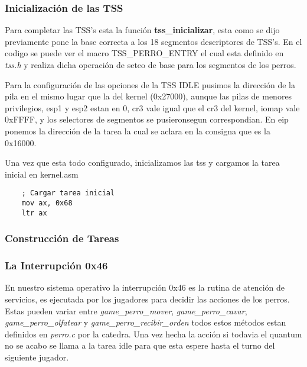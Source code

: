 \subsubsection{Inicialización de las TSS}
Para completar las TSS's esta la función \textbf{tss\_inicializar}, esta como se dijo previamente pone la base correcta a los 18 segmentos descriptores de TSS's. En el codigo se puede ver el macro TSS\_PERRO\_ENTRY el cual esta definido en \textit{tss.h} y realiza dicha operación de seteo de base para los segmentos de los perros.

Para la configuración de las opciones de la TSS IDLE pusimos la dirección de la pila en el mismo lugar que la del kernel (0x27000), aunque las pilas de menores privilegios, esp1 y esp2 estan en 0, cr3 vale igual que el cr3 del kernel, iomap vale 0xFFFF, y los selectores de segmentos se pusieronsegun correspondian. En eip ponemos la dirección de la tarea la cual se aclara en la consigna que es la 0x16000.

Una vez que esta todo configurado, inicializamos las tss y cargamos la tarea inicial en kernel.asm

\begin{lstlisting}
	; Cargar tarea inicial
	mov ax, 0x68
	ltr ax
\end{lstlisting}

\subsubsection{Construcción de Tareas}


\subsubsection{La Interrupción 0x46}
En nuestro sistema operativo la interrupción 0x46 es la rutina de atención de servicios, es ejecutada por los jugadores para decidir las acciones de los perros. Estas pueden variar entre  \textit{game\_perro\_mover}, \textit{game\_perro\_cavar}, \textit{game\_perro\_olfatear} y \textit{game\_perro\_recibir\_orden} todos estos métodos estan definidos en \textit{perro.c} por la catedra. Una vez hecha la acción si todavia el quantum no se acabo se llama a la tarea idle para que esta espere hasta el turno del siguiente jugador.